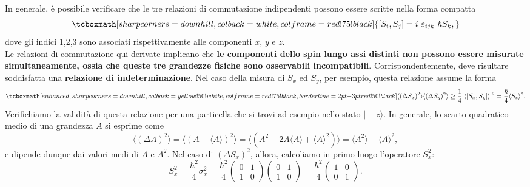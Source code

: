 In generale, è possibile verificare che le tre relazioni di commutazione indipendenti possono essere scritte nella forma compatta
	\begin{equation}
		\tcboxmath[sharp corners=downhill ,colback=white,colframe=red!75!black]{
			\left[ S_i , S_j\right] = i\ \varepsilon_{ijk}\ \hbar S_k,
			}
	\end{equation}
dove gli indici 1,2,3 sono associati rispettivamente alle componenti $x$, $y$ e $z$.\\
Le relazioni di commutazione qui derivate implicano che \textbf{le componenti dello spin lungo assi distinti non possono essere misurate simultaneamente, ossia che queste tre grandezze fisiche sono osservabili incompatibili}. Corrispondentemente, deve risultare soddisfatta una \textbf{relazione di indeterminazione}. Nel caso della misura di $S_x$ ed $S_y$, per esempio, questa relazione assume la forma
	\begin{equation}
		\label{eq:cap4_6}
		\tcboxmath[enhanced,sharp corners=downhill ,colback=yellow!50!white,colframe=red!75!black, borderline={2pt}{-3pt}{red!50!black}]{
			\langle (\Delta S_x) ^2 \rangle \langle (\Delta S_y) ^2 \rangle \geq \frac{1}{4} \vert \langle \left[ S_x , S_y \right] \rangle \vert ^2 = \frac{\hbar}{4} \langle S_z \rangle ^2 .
			}
	\end{equation}
Verifichiamo la validità di questa relazione per una particella che si trovi ad esempio nello stato $\vert +z\rangle$. In generale, lo scarto quadratico medio di una grandezza $A$ si esprime come
	\begin{equation}
		\langle (\Delta A ) ^2 \rangle = \langle (A- \langle A \rangle ) ^2 \rangle = \langle (A^2-2A\langle A \rangle + \langle A \rangle ^2) \rangle = \langle A^2\rangle - \langle A \rangle ^2,
	\end{equation}
e dipende dunque dai valori medi di $A$ e $A^2$. Nel caso di $(\Delta S_x) ^2$, allora, calcoliamo in primo luogo l'operatore $S_x ^2$:
	\begin{equation}
		S_x ^2 = \frac{\hbar ^2}{4} \sigma _x ^2=\frac{\hbar ^2}{4} \begin{pmatrix}
		0 & 1 \\
		1 & 0
		\end{pmatrix} \begin{pmatrix}
		0 & 1 \\
		1 & 0
		\end{pmatrix} = \frac{\hbar ^2}{4}\begin{pmatrix}
		1 & 0 \\
		0 & 1
		\end{pmatrix}.
	\end{equation}
